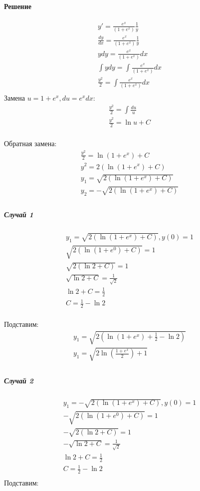 \paragraph{Решение}
\begin{gather*}
	y' = \frac{e^x}{(1 + e^x)} \frac{1}{y} \\
	\frac{dy}{dx} = \frac{e^x}{(1 + e^x)} \frac{1}{y} \\
	ydy = \frac{e^x}{(1 + e^x)}dx \\
	\int ydy = \int \frac{e^x}{(1 + e^x)}dx \\
	\frac{y^2}{2} = \int \frac{e^x}{(1 + e^x)}dx \\
\end{gather*}
Замена $u = 1 + e^x, du = e^xdx$:
\begin{gather*}
	\frac{y^2}{2} = \int \frac{du}{u} \\
	\frac{y^2}{2} = \ln u + C \\
\end{gather*}

Обратная замена:
\begin{gather*}
	\frac{y^2}{2} = \ln{(1 + e^x)}  + C \\
	y^2 = 2(\ln{(1 + e^x)}  + C) \\
	y_1 = \sqrt{2(\ln{(1 + e^x)}  + C)} \\
	y_2 = -\sqrt{2(\ln{(1 + e^x)}  + C)} \\
\end{gather*}

\subparagraph{Случай 1}
\begin{gather*}
	y_1 = \sqrt{2(\ln{(1 + e^x)}  + C)}, y(0) = 1 \\
	\sqrt{2(\ln{(1 + e^0)}  + C)} = 1 \\
	\sqrt{2(\ln{2}  + C)} = 1 \\
	\sqrt{\ln{2}  + C} = \frac{1}{\sqrt{2}} \\
	\ln{2}  + C = \frac{1}{2} \\
	C = \frac{1}{2} - \ln{2} \\
\end{gather*}

Подставим:
\begin{gather*}
	y_1 = \sqrt{2(\ln{(1 + e^x)}  + \frac{1}{2} - \ln{2})} \\
	y_1 = \sqrt{2\ln\left(\frac{1 + e^x}{2}\right) + 1} \\
\end{gather*}


\subparagraph{Случай 2}
\begin{gather*}
	y_1 = -\sqrt{2(\ln{(1 + e^x)}  + C)}, y(0) = 1 \\
	-\sqrt{2(\ln{(1 + e^0)}  + C)} = 1 \\
	-\sqrt{2(\ln{2}  + C)} = 1 \\
	-\sqrt{\ln{2}  + C} = \frac{1}{\sqrt{2}} \\
	\ln{2}  + C = \frac{1}{2} \\
	C = \frac{1}{2} - \ln{2} \\
\end{gather*}
Подставим:

